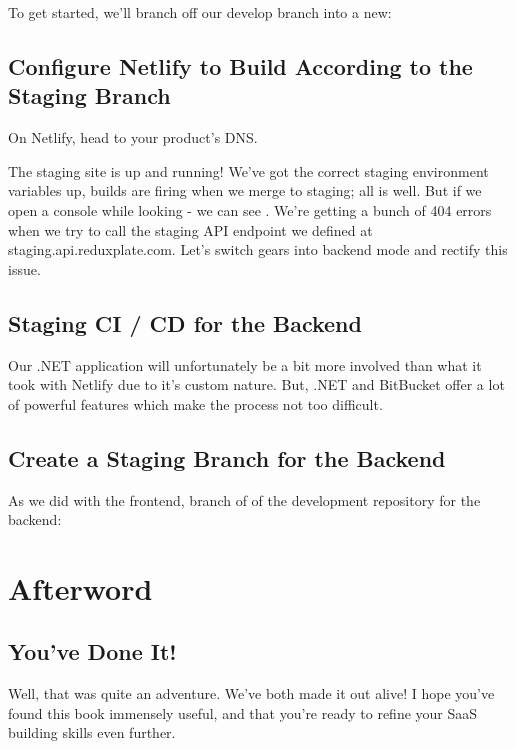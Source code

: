 \documentclass[a4paper,
                             oneside,
                             BCOR1.0cm,
                             DIV11,
                             parskip=full,
                             11pt]{scrbook}
\begin{document}
To get started, we'll branch off our develop branch into a new:

\section{Configure Netlify to Build According to the Staging Branch}\label{sec:titles}

On Netlify, head to your product's DNS.

The staging site is up and running! We've got the correct staging environment variables up, builds are firing when we merge to staging; all is well. But if we open a console while looking - we can see . We're getting a bunch of 404 errors when we try to call the staging API endpoint we defined at staging.api.reduxplate.com. Let's switch gears into backend mode and rectify this issue.

\section{Staging CI / CD for the Backend}\label{sec:titles}

Our .NET application will unfortunately be a bit more involved than what it took with Netlify due to it's custom nature. But, .NET and BitBucket offer a lot of powerful features which make the process not too difficult.

\section{Create a Staging Branch for the Backend}\label{sec:titles}

As we did with the frontend, branch of of the development repository for the backend:



\chapter*{Afterword}\label{cap:primer}

\section{You've Done It!}\label{sec:titles}

Well, that was quite an adventure. We've both made it out alive! I hope you've found this book immensely useful, and that you're ready to refine your SaaS building skills even further.
\end{document}
